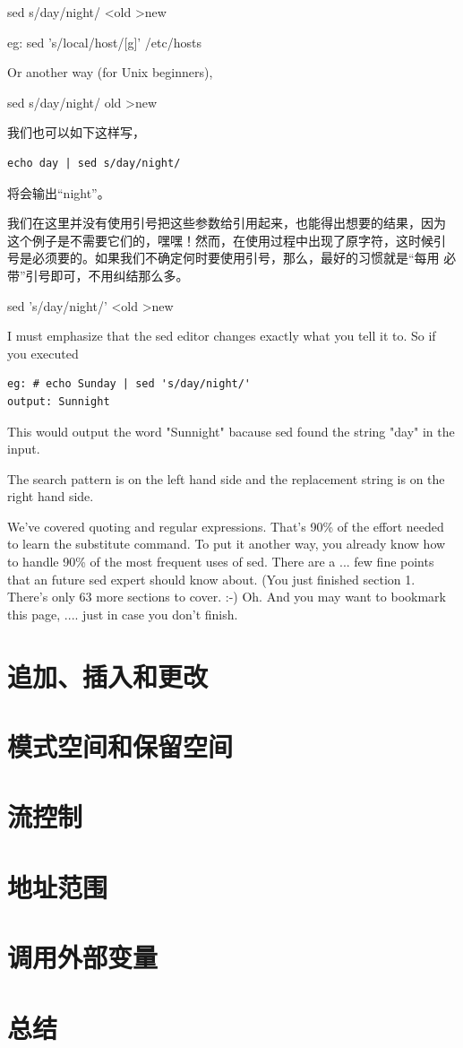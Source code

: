 sed s/day/night/ <old >new

eg: sed 's/local/host/[g]' /etc/hosts
 
Or another way (for Unix beginners), 

sed s/day/night/ old >new
 
我们也可以如下这样写，

\small{
\begin{verbatim}
echo day | sed s/day/night/ 
\end{verbatim}
}
\normalsize

将会输出“night”。

我们在这里并没有使用引号把这些参数给引用起来，也能得出想要的结果，因为
这个例子是不需要它们的，嘿嘿！然而，在使用过程中出现了原字符，这时候引
号是必须要的。如果我们不确定何时要使用引号，那么，最好的习惯就是“每用
必带”引号即可，不用纠结那么多。

sed 's/day/night/' <old >new

I must emphasize that the sed editor changes exactly what you tell it
to. So if you executed
 
\begin{verbatim}
eg: # echo Sunday | sed 's/day/night/'
output: Sunnight
\end{verbatim}
 
This would output the word "Sunnight" bacause sed found the string
"day" in the input.
 
The search pattern is on the left hand side and the replacement string
is on the right hand side.
 
We've covered quoting and regular expressions. That's 90\% of the
effort needed to learn the substitute command. To put it another way,
you already know how to handle 90\% of the most frequent uses of
sed. There are a ... few fine points that an future sed expert should
know about. (You just finished section 1. There's only 63 more
sections to cover. :-) Oh. And you may want to bookmark this page,
.... just in case you don't finish.

\section{追加、插入和更改}
\label{sec:appendInsertChange}

\section{模式空间和保留空间}
\label{sec:patternSpace}

\section{流控制}
\label{sec:flowControl}

\section{地址范围}
\label{sec:addrSpace}

\section{调用外部变量}
\label{sec:callExternalVariable}

\section{总结}
\label{sec:summary}

